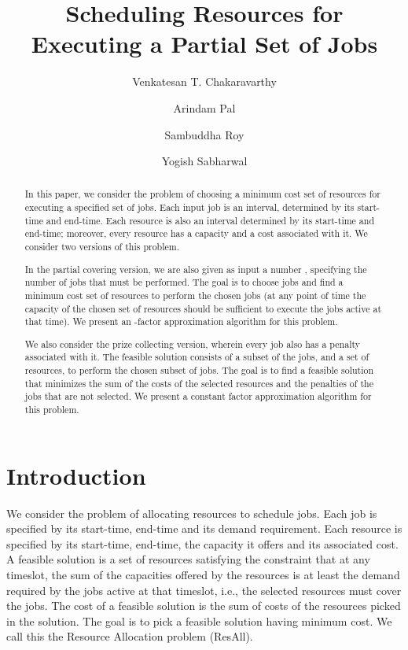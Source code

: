\documentclass[11pt]{article}
\title{Scheduling Resources for Executing a Partial Set of Jobs}
\author[1]{Venkatesan T. Chakaravarthy}
\author[2]{Arindam Pal}
\author[1]{Sambuddha Roy}
\author[1]{Yogish Sabharwal}
\affil[1]{IBM Research Lab, New Delhi, India\\
  \texttt{\{vechakra,sambuddha,ysabharwal\}@in.ibm.com}
}
\affil[2]{Indian Institute of Technology, New Delhi.\\
\texttt{arindamp@cse.iitd.ernet.in}
}
\newcommand{\ResAll} {{\sc ResAll}}
\begin{document}
\maketitle

\begin{abstract}
In this paper, we consider the problem of choosing a minimum cost set of resources for executing
 a specified set of jobs. 
 Each input job is an interval, determined by its start-time and end-time. Each resource is also an interval determined by its start-time and end-time; moreover, every resource has a capacity and a cost associated with it. 
We consider two versions of this problem. 

In the partial covering version, 
we are also given as input a number , specifying the number of jobs that must be performed. The goal is to choose  jobs and find a minimum cost set of resources to perform the chosen  jobs (at any point of time the capacity of the chosen set of resources should be sufficient to execute the jobs active at that time). We present an -factor approximation algorithm for this problem. 

We also consider the prize collecting version, wherein every job also has a penalty 
associated with it. The feasible solution consists of a subset of the jobs, and a set of resources, 
to perform the chosen subset of jobs. The goal is to find a feasible solution that minimizes the 
sum of the costs of the selected resources and the penalties of the jobs that are not selected. 
We present a constant factor approximation algorithm for this problem.
\end{abstract}

\section{Introduction}
\label{sec:intro}
We consider the problem of allocating resources to schedule jobs. 
Each job is specified by its start-time, end-time and its demand requirement.
Each resource is specified by its start-time, end-time, the capacity it offers and its associated cost. 
A feasible solution is a set of resources satisfying the constraint that at any timeslot, 
the sum of the capacities offered by the resources is at least the demand required by
the jobs active at that timeslot, i.e., the selected resources must cover the jobs.
The cost of a feasible solution is the sum of costs of the resources picked in the solution.
The goal is to pick a feasible solution having minimum cost.
We call this the Resource Allocation problem ({\ResAll}).
\end{document}
